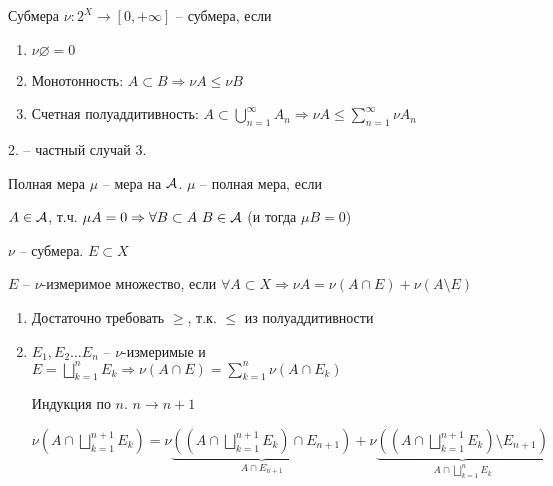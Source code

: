 \documentclass[12pt]{article}
\begin{document}
\begin{defin}{Субмера}
    $\nu : 2^X \to [0, + \infty]$ -- субмера, если 

    \begin{enumerate}
        \item $\nu \varnothing = 0$
        \item Монотонность: $A \subset B \Rightarrow \nu A \leq \nu B$
        \item Счетная полуаддитивность: $A \subset \bigcup\limits_{n = 1}^\infty A_n \Rightarrow \nu A \leq \sum\limits_{n = 1}^\infty \nu A_n$
    \end{enumerate}
\end{defin}

\begin{Remark}{}
    2. -- частный случай 3.
\end{Remark}

\begin{defin}{Полная мера}
    $\mu$ -- мера на $\mathcal{A}$. $\mu$ -- полная мера, если 

    $A \in \mathcal{A}$, т.ч. $\mu A = 0 \Rightarrow \forall B \subset A\ B \in \mathcal{A}$ (и тогда $\mu B = 0$)
\end{defin}

\begin{defin}{}
    $\nu$ -- субмера. $E \subset X$

    $E$ -- $\nu$-измеримое множество, если $\forall A \subset X \Rightarrow \nu A = \nu (A \cap E) + \nu (A \setminus E)$
\end{defin}

\begin{Remark}{}
    \begin{enumerate}
        \item Достаточно требовать $\geq$, т.к. $\leq$ из полуаддитивности 
        \item $E_1, E_2 \ldots E_n$ -- $\nu$-измеримые и $E = \bigsqcup\limits_{k = 1}^n E_k \Rightarrow \nu(A \cap E) = \sum\limits_{k = 1}^n \nu(A \cap E_k)$
        
        Индукция по $n$. $n \to n + 1$

        $\nu(A \cap \bigsqcup\limits_{k = 1}^{n + 1} E_k) = \nu \underbrace{((A \cap \bigsqcup\limits_{k = 1}^{n + 1} E_k) \cap E_{n + 1})}_{A \cap E_{n + 1}} + \nu \underbrace{((A \cap \bigsqcup\limits_{k = 1}^{n + 1} E_k) \setminus E_{n + 1})}_{A \cap \bigsqcup\limits_{k = 1}^n E_k}$
    \end{enumerate}
\end{Remark}
\end{document}
